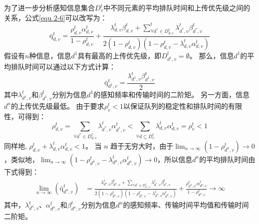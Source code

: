 为了进一步分析感知信息集合$D_v^t$中不同元素的平均排队时间和上传优先级之间的关系，公式\ref{equ 2-6}可以改写为：
\begin{equation}
\overline{\mathrm{q}}_{d, v}^t=\frac{\rho_{d, v}^t \alpha_{d, v}^t}{1-\rho_{d, v}^t}+\frac{\lambda_{d, v}^t \beta_{d, v}^t+\sum_{\forall d^* \in D_{d, v}^t}^t \lambda_{d^*, v}^t \beta_{d^*, v}^t}{2\left(1-\rho_{d, v}^t\right)\left(1-\rho_{d, v}^t-\lambda_{d, v}^t \alpha_{d, v}^t\right)}
\end{equation}
假设有$n$种信息，信息${d^1}$具有最高的上传优先级，即$D_{d^1, v}^t = \emptyset$。
那么，信息${d^1}$的平均排队时间可以通过以下方式计算：
\begin{equation}
\operatorname{\bar{q}}_{d^{1}, v}^t=\frac{\lambda_{d^1, v}^t \beta_{d^1, v}^t}{2}
\end{equation}
其中$\lambda_{d^1, v}^t$和$\beta_{d^1, v}^t$分别为信息$d^1$的感知频率和传输时间的二阶矩。
另一方面，信息${d^n}$的上传优先级最低。
由于要求$\rho_v^t < 1$以保证队列的稳定性和排队时间的有限性，可得到：
\begin{equation}
\rho_{d, v}^t=\sum_{\forall d^* \in D_{d, v}^t} \lambda_{d^*, v}^t \alpha_{d^*, v}^t<\sum_{\forall d \subseteq D_v^t} \lambda_{d, v}^t \alpha_{d, v}^t=\rho_v^t<1
\end{equation}
同样地, $\rho_{d, v}^t+\lambda_{d, v}^t \alpha_{d, v}^t<1$。
当 $n$ 趋于无穷大时，由于$\lim _{n \rightarrow \infty}(1-\rho_{d^n, v}^t) \rightarrow 0$，类似地，$\lim _{n \rightarrow \infty}(1-\rho_{d^n, v}^t-\lambda_{d^n, v}^t \alpha_{d^n, v}^t) \rightarrow 0$，所以信息${d^n}$的平均排队时间由下式得到：
\begin{equation}
\begin{aligned}
	\lim _{n \rightarrow \infty}\left(\mathrm{\bar{q}}_{d^n, v}^t\right)&=\frac{\lambda_{d^n, v}^t \beta_{d^n, v}^t+\sum_{\forall d^* \in D_{d^n, v}^t} \lambda_{d^*, v}^t \beta_{d^*, v}^t}{2\left(1-\rho_{d^n, v}^t\right)\left(1-\rho_{d^n, v}^t-\lambda_{d^n, v}^t \alpha_{d^n, v}^t\right)} + \frac{\rho_{d^n, v^t}^t \alpha_{d^n, v}^t}{1-\rho_{d^n, v}^t}\rightarrow \infty
\end{aligned}
\end{equation}
其中，$\lambda_{d^n, v}^t$、$\alpha_{d^n, v}^t$和$\beta_{d^n, v}^t$分别为信息$d^n$的感知频率、传输时间平均值和传输时间二阶矩。

